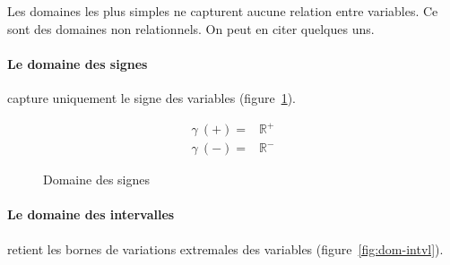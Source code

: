 Les domaines les plus simples ne capturent aucune relation entre variables. Ce
sont des domaines non relationnels. On peut en citer quelques uns.

\paragraph{Le domaine des signes} capture uniquement le signe des variables
(figure~\ref{fig:dom-sig}).

\begin{figure}%
\centering
{}

\begin{align*}
\gamma~(+) = & \mathbb{R}^+ \\
\gamma~(-) = & \mathbb{R}^-
\end{align*}

\caption{Domaine des signes}
\label{fig:dom-sig}
\end{figure}%

\paragraph{Le domaine des intervalles} retient les bornes de variations
extremales des variables (figure~\ref{fig:dom-intvl}).

